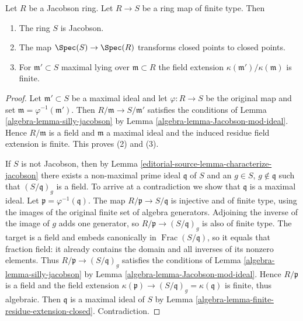 \begin{proposition}
\label{editorial-source-proposition-Jacobson-permanence}
Let $R$ be a Jacobson ring. Let $R \to S$ be a
ring map of finite type. Then
\begin{enumerate}
\item The ring $S$ is Jacobson.
\item The map $\Spec(S) \to \Spec(R)$ transforms
closed points to closed points.
\item For $\mathfrak m' \subset S$ maximal lying over $\mathfrak m \subset R$
the field extension $\kappa(\mathfrak m')/\kappa(\mathfrak m)$
is finite.
\end{enumerate}
\end{proposition}

\begin{proof}
Let $\mathfrak m' \subset S$ be a maximal ideal and
let $\varphi:R\to S$ be the original map and set
$\mathfrak m=\varphi^{-1}(\mathfrak m')$.
Then $R/\mathfrak m \to S/\mathfrak m'$ satisfies
the conditions of Lemma \ref{algebra-lemma-silly-jacobson}
by Lemma \ref{algebra-lemma-Jacobson-mod-ideal}.
Hence $R/\mathfrak m$ is a field and
$\mathfrak m$ a maximal ideal and the induced
residue field extension is finite. This proves (2) and (3).  

\medskip\noindent
If $S$ is not Jacobson, then by Lemma \ref{editorial-source-lemma-characterize-jacobson} there
exists a non-maximal prime ideal $\mathfrak q$ of $S$ and an
$g \in S$, $g \not\in \mathfrak q$ such that $(S/\mathfrak q)_g$ is a field.
To arrive at a contradiction we show that $\mathfrak q$ is a maximal ideal.
Let $\mathfrak p=\varphi^{-1}(\mathfrak q)$.
The map $R/\mathfrak p\to S/\mathfrak q$ is injective and of finite
type, using the images of the original finite set of algebra generators.
Adjoining the inverse of the image of $g$ adds one generator, so
$R/\mathfrak p\to(S/\mathfrak q)_g$ is also of finite type.
The target is a field and embeds canonically in
$\operatorname{Frac}(S/\mathfrak q)$, so it equals that fraction
field: it already contains the domain and all inverses of its nonzero
elements. Thus
$R/\mathfrak p \to (S/\mathfrak q)_g$ satisfies the conditions of
Lemma \ref{algebra-lemma-silly-jacobson} by
Lemma \ref{algebra-lemma-Jacobson-mod-ideal}.
Hence $R/\mathfrak p$ is a field and the field extension
$\kappa(\mathfrak p) \to (S/\mathfrak q)_g = \kappa(\mathfrak q)$ is
finite, thus algebraic. Then $\mathfrak q$ is a maximal ideal of $S$ by
Lemma \ref{algebra-lemma-finite-residue-extension-closed}. Contradiction.
\end{proof}